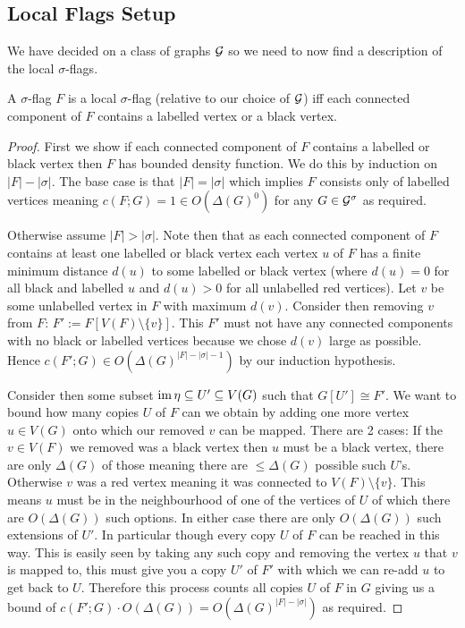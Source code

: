\subsection{Local Flags Setup}

We have decided on a class of graphs $\mathcal{G}$ so we need to now find a description of
the local $\sigma$-flags.

\begin{lemma}
    \label{lemma:pentagon_local_flags}
    A $\sigma$-flag $F$ is a local $\sigma$-flag (relative to our choice of
    $\mathcal{G}$) iff each connected component of $F$ contains a labelled vertex or a
    black vertex.
\end{lemma}

\begin{proof}
    First we show if each connected component of $F$ contains a labelled or black
    vertex then $F$ has bounded density function. We do this by induction on $|F|-|\sigma|$.
    The base case is that $|F|=|\sigma|$ which implies $F$ consists only of labelled
    vertices meaning $c(F; G) = 1 \in O(\Delta(G)^0)$ for any $G\in\mathcal{G}^\sigma$
    as required.

    Otherwise assume $|F|>|\sigma|$. Note then that as each connected component of
    $F$ contains at least one labelled or black vertex each vertex $u$ of $F$ has a
    finite minimum distance $d(u)$ to some labelled or black vertex (where
    $d(u)=0$ for all black and labelled $u$ and $d(u) > 0$ for all unlabelled red vertices).
    Let $v$ be some unlabelled vertex in $F$ with maximum $d(v)$. Consider then removing $v$ from
    $F$: $F' := F[V(F)\setminus \{v\}]$. This $F'$ must not have any connected
    components with no black or labelled vertices because we chose $d(v)$ large as
    possible. Hence $c(F'; G) \in O\left(\Delta(G)^{|F|-|\sigma|-1}\right)$ by our
    induction hypothesis.

    Consider then some subset $\operatorname{im}\eta\subseteq U' \subseteq V(G)$ such that
    $G[U'] \cong F'$. We want to bound how many copies $U$ of $F$ can we obtain
    by adding one more vertex $u\in V(G)$ onto which our removed $v$ can be mapped.
    There are 2 cases: If the $v\in V(F)$ we removed was a black vertex then
    $u$ must be a black vertex, there are only $\Delta(G)$ of those meaning there
    are $\leq \Delta(G)$ possible such $U$'s. Otherwise $v$ was a red vertex
    meaning it was connected to $V(F)\setminus\{v\}$. This means $u$ must be
    in the neighbourhood of one of the vertices of $U$ of which there are
    $O(\Delta(G))$ such options. In either case there are only $O(\Delta(G))$ such
    extensions of $U'$.
    In particular though every copy $U$ of $F$ can be reached in this way. This is easily
    seen by taking any such copy and removing the vertex $u$ that $v$ is mapped to, this must
    give you a copy $U'$ of $F'$ with which we can re-add $u$ to get back to $U$.
    Therefore this process counts all copies $U$ of $F$ in $G$ giving us a bound of
    $c(F'; G) \cdot O(\Delta(G)) = O\left(\Delta(G)^{|F|-|\sigma|}\right)$ as required.


\end{proof}
